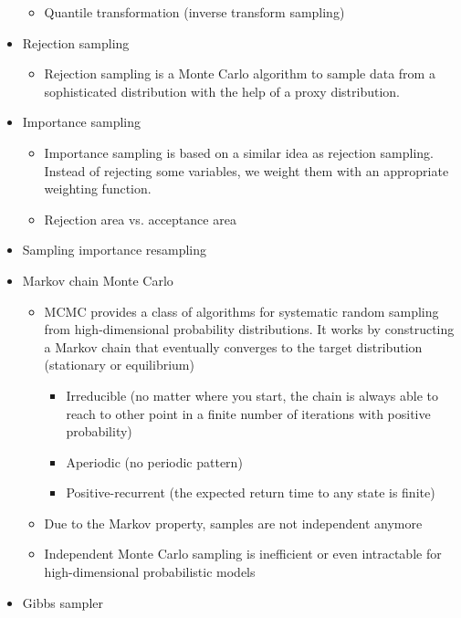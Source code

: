 \documentclass[a4paper]{article}
\begin{document}
\begin{itemize}
    \begin{itemize}
        \item Quantile transformation (inverse transform sampling)
    \end{itemize}
    \item Rejection sampling
    \begin{itemize}
        \item Rejection sampling is a Monte Carlo algorithm to sample data from a sophisticated distribution with the help of a proxy distribution.
    \end{itemize}
    \item Importance sampling
    \begin{itemize}
        \item Importance sampling is based on a similar idea as rejection sampling. Instead of rejecting some variables, we weight them with an appropriate weighting function.
        \item Rejection area vs. acceptance area
    \end{itemize}
    \item Sampling importance resampling
    \item Markov chain Monte Carlo
    \begin{itemize}
        \item MCMC provides a class of algorithms for systematic random sampling from high-dimensional probability distributions. It works by constructing a Markov chain that eventually converges to the target distribution (stationary or equilibrium)
        \begin{itemize}
            \item Irreducible (no matter where you start, the chain is always able to reach to other point in a finite number of iterations with positive probability)
            \item Aperiodic (no periodic pattern)
            \item Positive-recurrent (the expected return time to any state is finite)
        \end{itemize}
        \item Due to the Markov property, samples are not independent anymore
        \item Independent Monte Carlo sampling is inefficient or even intractable for high-dimensional probabilistic models
    \end{itemize}
    \item Gibbs sampler
    \begin{itemize}

\end{itemize}
\end{itemize}
\end{document}
